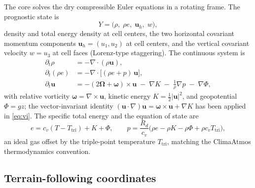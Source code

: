 \documentclass[11pt]{article}
\newcommand{\uu}{\boldsymbol{u}}
\newcommand{\uh}{\uu_h}
\newcommand{\om}{\boldsymbol{\omega}}
\newcommand{\Rd}{R_d}
\newcommand{\cv}{c_v}
\begin{document}
The core solves the dry compressible Euler equations in a rotating frame.
The prognostic state is
\begin{equation}
Y = \big(\rho,\; \rho e,\; \uh,\; w\big),
\end{equation}
density and total energy density at cell centers, the two horizontal
covariant momentum components $\uh = (u_1, u_2)$ at cell centers, and the
vertical covariant velocity $w = u_3$ at cell faces (Lorenz-type
staggering). The continuous system is
\begin{align}
\partial_t \rho &= -\nabla\!\cdot(\rho\uu),
\label{eq:mass}\\
\partial_t (\rho e) &= -\nabla\!\cdot\big[(\rho e + p)\,\uu\big],
\label{eq:energy}\\
\partial_t \uu &= -(2\boldsymbol{\Omega} + \om)\times\uu
  \;-\; \nabla K \;-\; \frac{1}{\rho}\nabla p \;-\; \nabla\Phi,
\label{eq:vi}
\end{align}
with relative vorticity $\om = \nabla\times\uu$, kinetic energy
$K = \tfrac12|\uu|^2$, and geopotential $\Phi = gz$; the vector-invariant
identity $(\uu\cdot\nabla)\uu = \om\times\uu + \nabla K$ has been applied
in \eqref{eq:vi}. The specific total energy and the equation of state are
\begin{equation}
e = \cv (T - T_{\mathrm{tri}}) + K + \Phi,
\qquad
p = \frac{\Rd}{\cv}\Big(\rho e - \rho K - \rho\Phi
 + \rho \cv T_{\mathrm{tri}}\Big),
\label{eq:eos}
\end{equation}
an ideal gas offset by the triple-point temperature $T_{\mathrm{tri}}$,
matching the ClimaAtmos thermodynamics convention.

\subsection{Terrain-following coordinates}
\label{sec:terrain}
\end{document}
